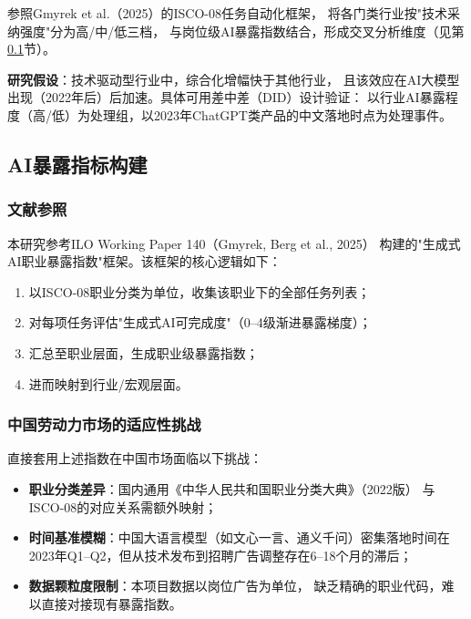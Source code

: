 \documentclass[12pt,a4paper]{ctexart}
\begin{document}
参照Gmyrek et al.（2025）的ISCO-08任务自动化框架，
将各门类行业按"技术采纳强度"分为高/中/低三档，
与岗位级AI暴露指数结合，形成交叉分析维度（见第\ref{sec:plan_ai}节）。

\textbf{研究假设}：技术驱动型行业中，综合化增幅快于其他行业，
且该效应在AI大模型出现（2022年后）后加速。具体可用差中差（DID）设计验证：
以行业AI暴露程度（高/低）为处理组，以2023年ChatGPT类产品的中文落地时点为处理事件。

\subsection{AI暴露指标构建}
\label{sec:plan_ai}

\subsubsection{文献参照}

本研究参考ILO Working Paper 140（Gmyrek, Berg et al., 2025）
构建的"生成式AI职业暴露指数"框架。该框架的核心逻辑如下：

\begin{enumerate}
    \item 以ISCO-08职业分类为单位，收集该职业下的全部任务列表；
    \item 对每项任务评估"生成式AI可完成度"（0--4级渐进暴露梯度）；
    \item 汇总至职业层面，生成职业级暴露指数；
    \item 进而映射到行业/宏观层面。
\end{enumerate}

\subsubsection{中国劳动力市场的适应性挑战}

直接套用上述指数在中国市场面临以下挑战：

\begin{itemize}
    \item \textbf{职业分类差异}：国内通用《中华人民共和国职业分类大典》（2022版）
    与ISCO-08的对应关系需额外映射；

    \item \textbf{时间基准模糊}：中国大语言模型（如文心一言、通义千问）密集落地时间在
    2023年Q1--Q2，但从技术发布到招聘广告调整存在6--18个月的滞后；

    \item \textbf{数据颗粒度限制}：本项目数据以岗位广告为单位，
    缺乏精确的职业代码，难以直接对接现有暴露指数。
\end{itemize}
\end{document}
